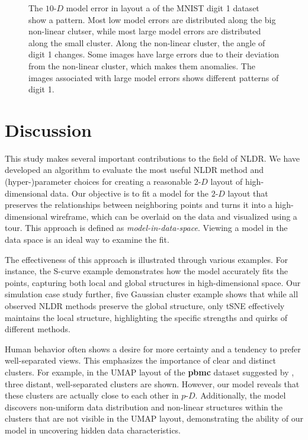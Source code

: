 \documentclass[
  12pt]{article}
\newcommand\pD{$p\text{-}D$}
\newcommand\gD{$2\text{-}D$}
\begin{document}
\begin{figure}[H]


\caption{\label{fig-model-error-mnist}The \(10\text{-}D\) model error in
layout a of the MNIST digit 1 dataset show a pattern. Most low model
errors are distributed along the big non-linear clutser, while most
large model errors are distributed along the small cluster. Along the
non-linear cluster, the angle of digit 1 changes. Some images have large
errors due to their deviation from the non-linear cluster, which makes
them anomalies. The images associated with large model errors shows
different patterns of digit 1.}

\end{figure}%

\section{Discussion}\label{sec-discussion}

This study makes several important contributions to the field of NLDR.
We have developed an algorithm to evaluate the most useful NLDR method
and (hyper-)parameter choices for creating a reasonable \gD{} layout of
high-dimensional data. Our objective is to fit a model for the \gD{}
layout that preserves the relationships between neighboring points and
turns it into a high-dimensional wireframe, which can be overlaid on the
data and visualized using a tour. This approach is defined as
\emph{model-in-data-space}. Viewing a model in the data space is an
ideal way to examine the fit.

The effectiveness of this approach is illustrated through various
examples. For instance, the S-curve example demonstrates how the model
accurately fits the points, capturing both local and global structures
in high-dimensional space. Our simulation case study further, five
Gaussian cluster example shows that while all observed NLDR methods
preserve the global structure, only tSNE effectively maintains the local
structure, highlighting the specific strengths and quirks of different
methods.

Human behavior often shows a desire for more certainty and a tendency to
prefer well-separated views. This emphasizes the importance of clear and
distinct clusters. For example, in the UMAP layout of the \textbf{pbmc}
dataset suggested by \citet{chen2023}, three distant, well-separated
clusters are shown. However, our model reveals that these clusters are
actually close to each other in \pD{}. Additionally, the model discovers
non-uniform data distribution and non-linear structures within the
clusters that are not visible in the UMAP layout, demonstrating the
ability of our model in uncovering hidden data characteristics.
\end{document}
